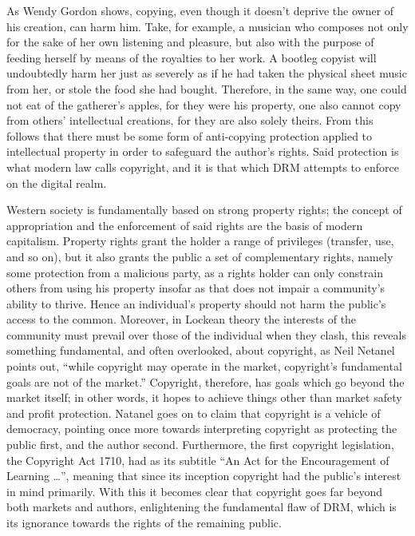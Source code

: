\documentclass[12pt,letterpaper]{article}
\begin{document}
As Wendy Gordon shows, copying, even though it doesn't deprive the owner of his creation, can harm him. Take, for example, a musician who composes not only for the sake of her own listening and pleasure, but also with the purpose of feeding herself by means of the royalties to her work. A bootleg copyist will undoubtedly harm her just as severely as if he had taken the physical sheet music from her, or stole the food she had bought.\autocite[\ppno~1548]{gordon-1993} Therefore, in the same way, one could not eat of the gatherer's apples, for they were his property, one also cannot copy from others' intellectual creations, for they are also solely theirs. From this follows that there must be some form of anti-copying protection applied to intellectual property in order to safeguard the author's rights. Said protection is what modern law calls copyright, and it is that which DRM attempts to enforce on the digital realm.

Western society is fundamentally based on strong property rights; the concept of appropriation and the enforcement of said rights are the basis of modern capitalism. Property rights grant the holder a range of privileges (transfer, use, and so on), but it also grants the public a set of complementary rights, namely some protection from a malicious party, as a rights holder can only constrain others from using his property insofar as that does not impair a community's ability to
thrive\autocite[\ppno~1555--1560]{gordon-1993}. Hence an individual's property should not harm the public's access to the common. Moreover, in Lockean theory the interests of the community must prevail over those of the individual when they clash\autocite[\ppno~120]{favale-2014}, this reveals something fundamental, and often overlooked, about copyright, as Neil Netanel points out, ``while copyright may operate in the market, copyright's fundamental goals are not of the market.''\autocite[\ppno~341]{netanel-2001} Copyright, therefore, has goals which go beyond the market itself; in other words, it hopes to achieve things other than market safety and profit protection. Natanel goes on to claim that copyright is a vehicle of democracy, pointing once more towards interpreting copyright as protecting the public first, and the author second. Furthermore, the first copyright legislation, the Copyright Act 1710, had as its subtitle ``An Act for the Encouragement of Learning \ldots''\autocite{wortley-1710}, meaning that since its inception copyright had the public's interest in mind primarily. With this it becomes clear that copyright goes far beyond both markets and authors, enlightening the fundamental flaw of DRM, which is its ignorance towards the rights of the remaining public.
\end{document}
